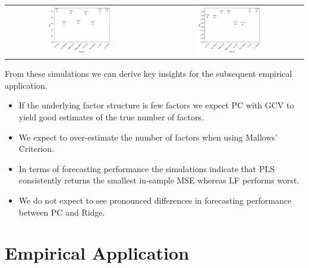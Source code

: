 \begin{table}[h! ]
\begin{tabular}{c c}
        \includegraphics[width=0.45\textwidth]{figures/N200_T500_DGP5_Sims25} &
        \includegraphics[width=0.45\textwidth]{figures/N200_T500_DGP6_Sims25}
    \end{tabular}
\end{table}

From these simulations we can derive key insights for the subsequent empirical application. 
\begin{itemize}
	\item If the underlying factor structure is few factors we expect PC with GCV to yield good estimates of the true number of factors. 
	\item We expect to over-estimate the number of factors when using Mallows' Criterion.
	\item In terms of forecasting performance the simulations indicate that PLS consistently returns the smallest in-sample MSE whereas LF performs worst.
	\item We do not expect to see pronounced differences in forecasting performance between PC and Ridge. 
\end{itemize}

\section{Empirical Application}
